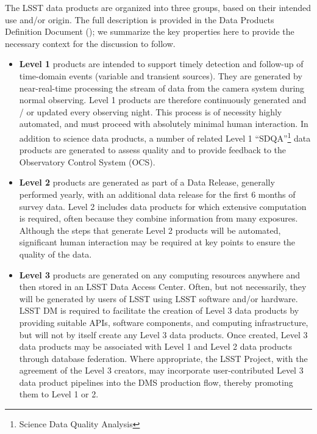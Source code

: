 The LSST data products are organized into three groups, based on their intended use and/or origin. The full description is provided in the Data Products Definition Document (\DPDD); we summarize the key properties here to provide the necessary context for the discussion to follow.

\begin{itemize}
\item {\bf Level 1} products are intended to support timely detection and follow-up
  of time-domain events (variable and transient sources). They are generated by
  near-real-time processing the stream of data from the camera system during
  normal observing.  Level 1 products are therefore continuously generated and / or
  updated every observing night. This process is of necessity highly
  automated, and must proceed with absolutely minimal human
  interaction.  In addition to science data products, a number of related
  Level 1 ``SDQA''\footnote{Science Data Quality Analysis} data products are generated
  to assess quality and to provide feedback to the Observatory Control System (OCS).

\item {\bf Level 2} products are generated as part of a Data Release, generally
  performed
  yearly, with an additional data release for the first 6 months of survey data.
  Level 2 includes data products for which extensive
  computation is required, often because they combine information from
  many exposures.  Although the steps that generate Level 2 products
  will be automated, significant human interaction may be required at
  key points to ensure the quality of the data.

\item {\bf Level 3} products are generated on any computing resources
  anywhere and then stored in an LSST Data Access Center. Often, but not
  necessarily, they will be generated by users of LSST using LSST software
  and/or hardware. LSST DM is required to facilitate the creation of
  Level 3 data products by providing suitable APIs, software components, and
  computing infrastructure, but will not by itself create any Level 3
  data products. Once created, Level 3 data products may be associated with
  Level 1 and Level 2 data products through database federation.
  Where appropriate, the LSST Project, with the agreement of the Level 3
  creators, may incorporate user-contributed Level 3 data product pipelines
  into the DMS production flow, thereby promoting them to Level 1 or 2.

\end{itemize}

